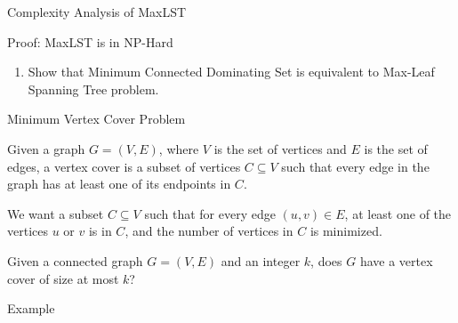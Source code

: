 \documentclass[xcolor=svgnames]{beamer}
\begin{document}
\begin{section}{Complexity Analysis of MaxLST}
\begin{frame}{Proof: MaxLST is in NP-Hard}
\begin{enumerate} [<+->]
            \item Show that Minimum Connected Dominating Set is equivalent to Max-Leaf Spanning Tree problem.
        \end{enumerate}
    \end{frame}
    \begin{frame}{Minimum Vertex Cover Problem}
        \begin{description}[<+->]
            \item[Vertex Cover:]Given a graph $G=(V,E)$, where $V$ is the set of vertices and $E$ is the set of edges, a vertex cover is a subset of vertices $C \subseteq V$ such that every edge in the graph has at least one of its endpoints in $C$. 
            \item[Objective:] We want a subset $C \subseteq V$ such that for every edge $(u,v) \in E$, at least one of the vertices $u$ or $v$ is in $C$, and the number of vertices in $C$ is minimized. 
            \item[Question:]Given a connected graph $G = (V, E)$ and an integer $k$, does $G$ have a vertex cover of size at most $k$?   
        \end{description}
    \end{frame}
    \begin{frame}{Example}
        \begin{columns}

            \begin{column}{0.45\textwidth}
                \centering
\end{column}
\end{columns}
\end{frame}
\end{section}
\end{document}
